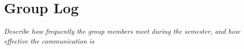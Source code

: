
\section{Group Log}\label{sec:group-log}
    \emph{Describe how frequently the group members meet during the semester, and how effective the communication is}
